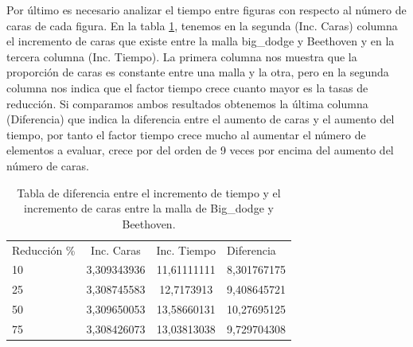 Por último es necesario analizar el tiempo entre figuras con respecto al número de caras de cada figura. En la tabla \ref{tab:inc_coche_beethoven}, tenemos en la segunda (Inc. Caras) columna el incremento de caras que existe entre la malla big\_dodge y Beethoven y en la tercera columna (Inc. Tiempo). La primera columna nos muestra que la proporción de caras es constante entre una malla y la otra, pero en la segunda columna nos indica que el factor tiempo crece cuanto mayor es la tasas de reducción. Si comparamos ambos resultados obtenemos la última columna (Diferencia) que indica la diferencia entre el aumento de caras y el aumento del tiempo, por tanto el factor tiempo crece mucho al aumentar el número de elementos a evaluar, crece por del orden de 9 veces por encima del aumento del número de caras.

\begin{table}[]
	\centering
\begin{tabular}{l|c|c|c|}
	\cline{2-4}
	Reducción \% & Inc. Caras  & \multicolumn{1}{l|}{Inc. Tiempo} & \multicolumn{1}{l|}{Diferencia} \\ \cline{2-4} 
	10           & 3,309343936 & 11,61111111                      & 8,301767175                     \\ \cline{2-4} 
	25           & 3,308745583 & 12,7173913                       & 9,408645721                     \\ \cline{2-4} 
	50           & 3,309650053 & 13,58660131                      & 10,27695125                     \\ \cline{2-4} 
	75           & 3,308426073 & 13,03813038                      & 9,729704308                     \\ \cline{2-4} 
\end{tabular}
	\caption{Tabla de diferencia entre el incremento de tiempo y el incremento de caras entre la malla de Big\_dodge y Beethoven.}
	\label{tab:inc_coche_beethoven}
\end{table}